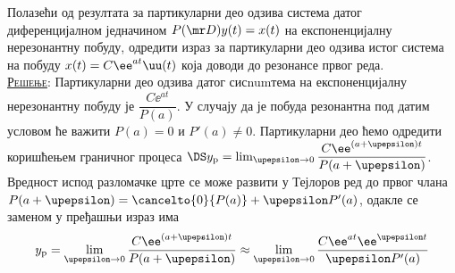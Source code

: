 \PID Полазећи од резултата за партикуларни део одзива система датог диференцијалном једначином
$P(\mr D) y(t) = x(t)$ на експоненцијалну нерезонантну побуду, одредити израз за партикуларни део 
одзива истог система на побуду $x(t) = C\ee^{at}\uu(t)$ која доводи до резонансе првог реда. \\

\textsc{\underline{Решење}}: Партикуларни део одзива датог сисnumтема на експоненцијалну нерезонантну побуду
је $\dfrac{C\ee^{at}}{P(a)}$. У случају да је побуда резонантна под датим условом ће важити
$P(a) = 0$ и $P'(a) \neq 0$. Партикуларни део ћемо одредити коришћењем граничног процеса 
$\DS y_{\rm p} = \lim_{\upepsilon\to 0}\dfrac{C\ee^{(a+\upepsilon)t}}{P(a + \upepsilon)}$. 
Вредност испод разломачке црте се може развити у Тејлоров ред до првог члана 
$P(a+\upepsilon) = \cancelto{0}{P(a)} + \upepsilon P'(a)$, одакле се заменом у пређашњи 
израз има
\begin{equation}
    y_{\rm p} = \lim_{\upepsilon\to 0}\dfrac{C\ee^{(a+\upepsilon)t}}{P(a + \upepsilon)} \approx 
    \lim_{\upepsilon\to 0}\dfrac{C\ee^{a t} \ee^{\upepsilon t}}{\upepsilon P'(a) }
\end{equation}